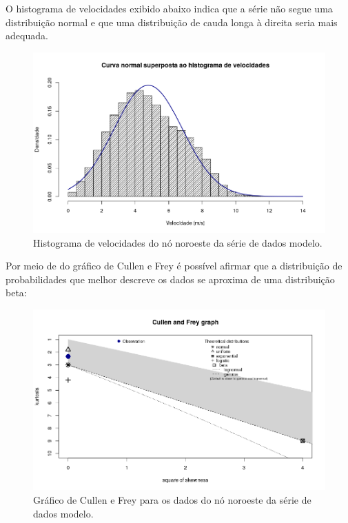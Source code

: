 \documentclass[
	12pt,				%
	openright,			%
	oneside,			%
	a4paper,			%
	english,			%
	french,				%
	spanish,			%
	brazil				%
	]{abntex2}
\begin{document}
O histograma de velocidades exibido abaixo indica que a série não segue uma distribuição normal e que uma distribuição de cauda longa à direita seria mais adequada. 

\begin{figure}[h]
    \centering
	\includegraphics[width=\textwidth]{normal_overlay}
	\caption{Histograma de velocidades do nó noroeste da série de dados modelo.}
\end{figure}
\FloatBarrier

Por meio de do gráfico de Cullen e Frey é possível afirmar que a distribuição de probabilidades que melhor descreve os dados se aproxima de uma distribuição beta:

\begin{figure}[h]
    \centering
	\includegraphics[width=\textwidth]{cullen}
	\caption{Gráfico de Cullen e Frey para os dados do nó noroeste da série de dados modelo.}
\end{figure}
\FloatBarrier
\end{document}

